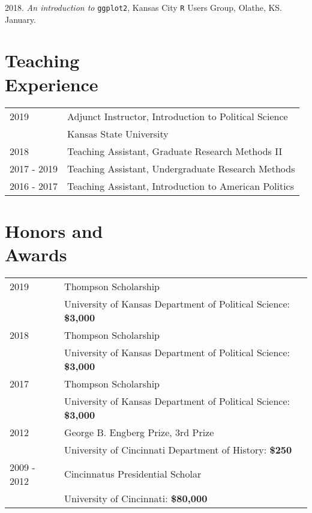 \documentclass[margin,line,pifont,palatino,courier]{res}
\begin{document}
\begin{resume}
2018. \emph{An introduction to} \verb+ggplot2+, Kansas City \verb+R+ Users Group,
Olathe, KS. January.

\newpage
\section{\sc Teaching\\ Experience}

\begin{tabular}{@{}p{0.8in}p{3.5in}}
  2019        & Adjunct Instructor, Introduction to Political Science\\
              & Kansas State University\\
  2018        & Teaching Assistant, Graduate Research Methods II\\
  2017 - 2019 & Teaching Assistant, Undergraduate Research Methods\\
  2016 - 2017 & Teaching Assistant, Introduction to American Politics\\
\end{tabular}



\section{\sc Honors and\\ Awards}

\begin{tabular}{@{}p{0.8in}p{4in}}
2019       & Thompson Scholarship\\
           & University of Kansas Department of Political Science: \bf{\$3,000}  \\
2018       & Thompson Scholarship\\
           & University of Kansas Department of Political Science: \bf{\$3,000}  \\
2017       & Thompson Scholarship\\
           & University of Kansas Department of Political Science: \bf{\$3,000}  \\
2012       & George B. Engberg Prize, 3rd Prize  \\
           & University of Cincinnati Department of History: \bf{\$250}  \\
2009 - 2012 & Cincinnatus Presidential Scholar\\
           & University of Cincinnati: \bf{\$80,000} \\
\end{tabular}


\end{resume}
\end{document}
